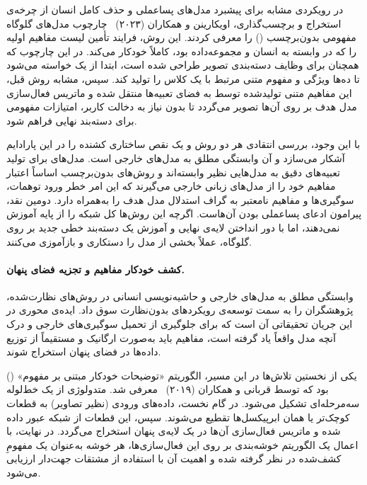 در رویکردی مشابه برای پیشبرد مدل‌های پساعملی و حذف کامل انسان از چرخه‌ی استخراج و برچسب‌گذاری، اویکارینن و همکاران (۲۰۲۳)~\cite{oikarinen2023labelfree} چارچوب مدل‌های گلوگاه مفهومی بدون‌برچسب () را معرفی کردند. این روش، فرایند تأمین لیست مفاهیم اولیه را که در  وابسته به انسان و مجموعه‌داده بود، کاملاً خودکار می‌کند. در این چارچوب که همچنان برای وظایف دسته‌بندی تصویر طراحی شده است، ابتدا از یک  خواسته می‌شود تا ده‌ها ویژگی و مفهوم متنی مرتبط با یک کلاس را تولید کند. سپس، مشابه روش قبل، این مفاهیم متنی تولیدشده توسط  به فضای تعبیه‌ها منتقل شده و ماتریس فعال‌سازی مدل هدف بر روی آن‌ها تصویر می‌گردد تا بدون نیاز به دخالت کاربر، امتیازات مفهومی برای دسته‌بند نهایی فراهم شود.

با این وجود، بررسی انتقادی هر دو روش  و  یک نقص ساختاری کشنده را در این پارادایم آشکار می‌سازد و آن وابستگی مطلق به مدل‌های خارجی است. مدل‌های  برای تولید تعبیه‌های دقیق به مدل‌هایی نظیر  وابسته‌اند و روش‌های بدون‌برچسب اساساً اعتبار مفاهیم خود را از مدل‌های زبانی خارجی می‌گیرند که این امر خطر ورود توهمات، سوگیری‌ها و مفاهیم نامعتبر به گراف استدلال مدل هدف را به‌همراه دارد. دومین نقد، پیرامون ادعای پساعملی بودن آن‌هاست. اگرچه این روش‌ها کل شبکه را از پایه آموزش نمی‌دهند، اما با دور انداختن لایه‌ی نهایی و آموزش یک دسته‌بند خطی جدید بر روی گلوگاه، عملاً بخشی از مدل را دستکاری و بازآموزی می‌کنند.

\paragraph{کشف خودکار مفاهیم و تجزیه فضای پنهان.}

وابستگی مطلق به مدل‌های خارجی و حاشیه‌نویسی انسانی در روش‌های نظارت‌شده، پژوهشگران را به سمت توسعه‌ی رویکردهای بدون‌نظارت سوق داد. ایده‌ی محوری در این جریان تحقیقاتی آن است که برای جلوگیری از تحمیل سوگیری‌های خارجی و درک آنچه مدل واقعاً یاد گرفته است، مفاهیم باید به‌صورت ارگانیک و مستقیماً از توزیع داده‌ها در فضای پنهان استخراج شوند.

یکی از نخستین تلاش‌ها در این مسیر، الگوریتم «توضیحات خودکار مبتنی بر مفهوم» () بود که توسط قربانی و همکاران (۲۰۱۹)~\cite{ghorbani2019towards} معرفی شد. متدولوژی  از یک خط‌لوله سه‌مرحله‌ای تشکیل می‌شود. در گام نخست، داده‌های ورودی (نظیر تصاویر) به قطعات کوچک‌تر یا همان ابرپیکسل‌ها تقطیع می‌شوند. سپس، این قطعات از شبکه عبور داده شده و ماتریس فعال‌سازی آن‌ها در یک لایه‌ی پنهان استخراج می‌گردد. در نهایت، با اعمال یک الگوریتم خوشه‌بندی بر روی این فعال‌سازی‌ها، هر خوشه به‌عنوان یک مفهومِ کشف‌شده در نظر گرفته شده و اهمیت آن با استفاده از مشتقات جهت‌دار ارزیابی می‌شود.

